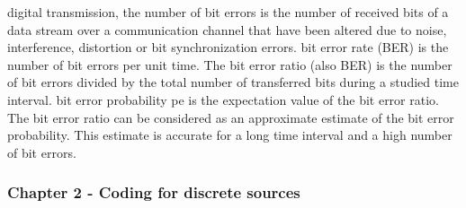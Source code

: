 \documentclass[12pt,a4paper]{report}
\begin{document}
	 digital transmission, the number of bit errors is the number of received bits of a data stream over a communication channel that have been altered due to noise, interference, distortion or bit synchronization errors.
	 bit error rate (BER) is the number of bit errors per unit time.
	 The bit error ratio (also BER) is the number of bit errors divided by the total number of transferred bits during a studied time interval. 
	  bit error probability pe is the expectation value of the bit error ratio. The bit error ratio can be considered as an approximate estimate of the bit error probability. This estimate is accurate for a long time interval and a high number of bit errors.
	
	
	\subsubsection{Chapter 2 - Coding for discrete sources}
	
\end{document}
